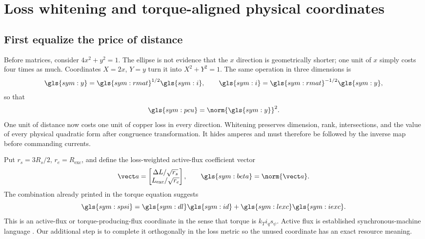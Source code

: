 \section{Loss whitening and torque-aligned physical coordinates}
\label{sec:whitening}

\subsection{First equalize the price of distance}

Before matrices, consider \(4x^2+y^2=1\). The ellipse is not evidence that
the \(x\) direction is geometrically shorter; one unit of \(x\) simply costs
four times as much. Coordinates \(X=2x\), \(Y=y\) turn it into
\(X^2+Y^2=1\). The same operation in three dimensions is
\begin{equation}
 \gls{sym:y}=\gls{sym:rmat}^{1/2}\gls{sym:i},\qquad
 \gls{sym:i}=\gls{sym:rmat}^{-1/2}\gls{sym:y},
 \label{eq:whitening-map}
\end{equation}
so that
\begin{equation}
 \gls{sym:pcu}=\norm{\gls{sym:y}}^2.
 \label{eq:whitened-loss}
\end{equation}
One unit of distance now costs one unit of copper loss in every direction.
Whitening preserves dimension, rank, intersections, and the value of every
physical quadratic form after congruence transformation. It hides amperes and
must therefore be followed by the inverse map before commanding currents.



Put \(r_s=3R_s/2\), \(r_e=R_{\mathrm{exc}}\), and define the loss-weighted
active-flux coefficient vector
\begin{equation}
 \vect a=\begin{bmatrix}\Delta L/\sqrt{r_s}\\L_{\mathrm{exc}}/\sqrt{r_e}\end{bmatrix},
 \qquad \gls{sym:beta}=\norm{\vect a}.
 \label{eq:active-vector}
\end{equation}
The combination already printed in the torque equation suggests
\begin{equation}
 \gls{sym:spsi}=\gls{sym:dl}\gls{sym:id}
 +\gls{sym:lexc}\gls{sym:iexc}.
 \label{eq:active-flux}
\end{equation}
This is an active-flux or torque-producing-flux coordinate in the sense that
torque is \(k_Ti_qs_\psi\). Active flux is established synchronous-machine
language \cite{boldea2008}. Our additional step is to complete it orthogonally
in the loss metric so the unused coordinate has an exact resource meaning.

